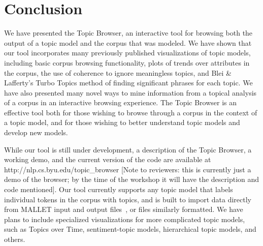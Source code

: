 \documentclass{article}
\begin{document}
\section{Conclusion}

We have presented the Topic Browser, an interactive tool for browsing both the
output of a topic model and the corpus that was modeled.  We have shown that
our tool incorporates many previously published visualizations of topic models,
including basic corpus browsing functionality, plots of trends over attributes
in the corpus, the use of coherence to ignore meaningless topics, and Blei \&
Lafferty's Turbo Topics method of finding significant phrases for each topic.
We have also presented many novel ways to mine information from a topical
analysis of a corpus in an interactive browsing experience.  The Topic Browser
is an effective tool both for those wishing to browse through a corpus in the
context of a topic model, and for those wishing to better understand topic
models and develop new models.


While our tool is still under development, a description of the Topic Browser,
a working demo, and the current version of the code are available at
http://nlp.cs.byu.edu/topic\_browser [Note to reviewers: this is currently just
a demo of the browser; by the time of the workshop it will have the description
and code mentioned].  Our tool currently supports any topic model that labels
individual tokens in the corpus with topics, and is built to import data
directly from MALLET input and output files~\cite{mallet}, or files similarly
formatted.  We have plans to include specialized visualizations for more
complicated topic models, such as Topics over Time, sentiment-topic models,
hierarchical topic models, and others.



\end{document}
